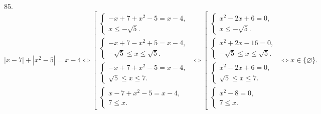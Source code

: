 85. $|x-7|+|x^2-5|=x-4\Leftrightarrow \left[\begin{array}{l}\begin{cases} -x+7+x^2-5=x-4,\\ x\leqslant -\sqrt{5}.\end{cases}\\
\begin{cases} -x+7-x^2+5=x-4,\\ -\sqrt{5}\leqslant x\leqslant \sqrt{5}.\end{cases}\\ \begin{cases} -x+7+x^2-5=x-4,\\ \sqrt{5}\leqslant x\leqslant7.\end{cases}\\
\begin{cases} x-7+x^2-5=x-4,\\ 7 \leqslant x.\end{cases}
\end{array}\right.\Leftrightarrow
\left[\begin{array}{l}\begin{cases} x^2-2x+6=0,\\ x\leqslant -\sqrt{5}.\end{cases}\\
\begin{cases} x^2+2x-16=0,\\ -\sqrt{5}\leqslant x\leqslant \sqrt{5}.\end{cases}\\ \begin{cases} x^2-2x+6=0,\\ \sqrt{5}\leqslant x\leqslant7.\end{cases}\\
\begin{cases} x^2-8=0,\\ 7 \leqslant x.\end{cases}
\end{array}\right.\Leftrightarrow x\in\{\varnothing\}.$\\
